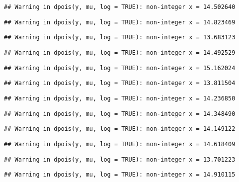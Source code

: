 \documentclass[
]{article}
\begin{document}
\begin{verbatim}
## Warning in dpois(y, mu, log = TRUE): non-integer x = 14.502640
\end{verbatim}

\begin{verbatim}
## Warning in dpois(y, mu, log = TRUE): non-integer x = 14.823469
\end{verbatim}

\begin{verbatim}
## Warning in dpois(y, mu, log = TRUE): non-integer x = 13.683123
\end{verbatim}

\begin{verbatim}
## Warning in dpois(y, mu, log = TRUE): non-integer x = 14.492529
\end{verbatim}

\begin{verbatim}
## Warning in dpois(y, mu, log = TRUE): non-integer x = 15.162024
\end{verbatim}

\begin{verbatim}
## Warning in dpois(y, mu, log = TRUE): non-integer x = 13.811504
\end{verbatim}

\begin{verbatim}
## Warning in dpois(y, mu, log = TRUE): non-integer x = 14.236850
\end{verbatim}

\begin{verbatim}
## Warning in dpois(y, mu, log = TRUE): non-integer x = 14.348490
\end{verbatim}

\begin{verbatim}
## Warning in dpois(y, mu, log = TRUE): non-integer x = 14.149122
\end{verbatim}

\begin{verbatim}
## Warning in dpois(y, mu, log = TRUE): non-integer x = 14.618409
\end{verbatim}

\begin{verbatim}
## Warning in dpois(y, mu, log = TRUE): non-integer x = 13.701223
\end{verbatim}

\begin{verbatim}
## Warning in dpois(y, mu, log = TRUE): non-integer x = 14.910115
\end{verbatim}
\end{document}
